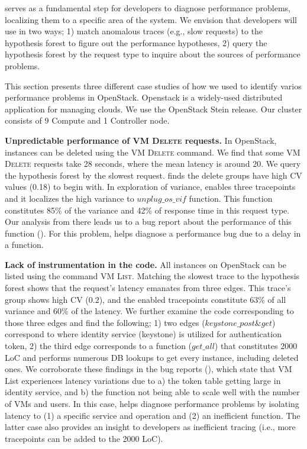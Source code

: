 \staif{} serves as a fundamental step for developers to
diagnose performance problems, localizing them to a specific area of
the system.  We envision that developers will use \staif{} in two ways;
1) match anomalous traces (e.g., slow requests) to the hypothesis
forest to figure out the performance hypotheses, 2) query the
hypothesis forest by the request type to inquire about the sources of
performance problems.

This section presents three different case studies of how we used \STAIF{} to
identify varios performance problems in OpenStack. Openstack is a widely-used distributed application for
managing clouds.  We use the OpenStack Stein release.  Our cluster
consists of 9 Compute and 1 Controller node.

\noindent\textbf{Unpredictable performance of \textsc{VM Delete} requests.}
In OpenStack, instances can be deleted using the \textsc{VM Delete} command. 
We find that some \textsc{VM Delete} requests take 28 seconds, where the mean latency is around 20.
We query the hypothesis forest by the slowest request.
\staif{} finds the delete groups have high CV values (0.18) to begin with.
In exploration of variance, \staif{} enables three tracepoints and 
it localizes the high variance to $unplug\_os\_vif$ function. %
This function constitutes 85\% of the variance and 42\% of response time in this request type.
Our analysis from there leads us to a bug report about the performance of this function (\cite{vifplug1,vifplug2}). %
For this problem, \staif{} helps diagnose a performance
bug due to a delay in a function. 


\noindent\textbf{Lack of instrumentation in the code. }
All instances on OpenStack can be listed using the command \textsc{VM List}.
Matching the slowest trace to the hypothesis forest shows that the request’s latency emanates from three edges. 
This trace's group shows high CV ($0.2$), and the enabled tracepoints constitute 63\% of all variance and 60\% of the latency.
We further examine the code corresponding to those three edges and find the following;
1) two edges ($keystone\_post \& get$) correspond to where identity service (keystone) is utilized for authentication token,
2) the third edge corresponds to a function ($get\_all$) that constitutes 2000 LoC and performs numerous DB lookups to get every instance, including deleted ones.
We corroborate these findings in the bug reports (\cite{listslow1,listslow2}),
 which state that {VM List} experiences latency variations due to  a) the token table getting large in identity service, and 
 b) the function not being able to scale well with the number of VMs and users.
In this case, \staif{} helps diagnose performance problems by isolating latency to (1) a specific service and operation and (2) an inefficient function. 
The latter case also provides an insight to developers as inefficient tracing (i.e., more tracepoints can be added to the 2000 LoC).

